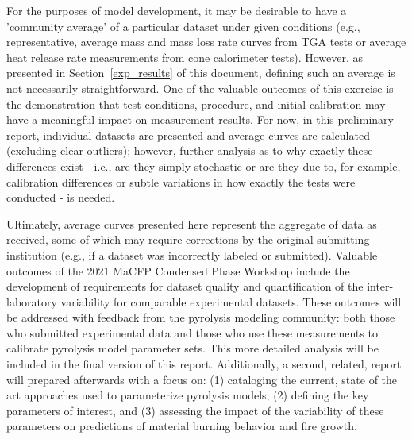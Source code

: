 \documentclass{book}
\begin{document}
For the purposes of model development, it may be desirable to have a 'community average' of a particular dataset under given conditions (e.g., representative, average mass and mass loss rate curves from TGA tests or average heat release rate measurements from cone calorimeter tests). However, as presented in Section~\ref{exp_results} of this document, defining such an average is not necessarily straightforward. One of the valuable outcomes of this exercise is the demonstration that test conditions, procedure, and initial calibration may have a meaningful impact on measurement results. For now, in this preliminary report, individual datasets are presented and average curves are calculated (excluding clear outliers); however, further analysis as to why exactly these differences exist - i.e., are they simply stochastic or are they due to, for example, calibration differences or subtle variations in how exactly the tests were conducted - is needed. 

Ultimately, average curves presented here represent the aggregate of data as received, some of which may require corrections by the original submitting institution (e.g., if a dataset was incorrectly labeled or submitted). Valuable outcomes of the 2021 MaCFP Condensed Phase Workshop include the development of requirements for dataset quality and quantification of the inter-laboratory variability for comparable experimental datasets. These outcomes will be addressed with feedback from the pyrolysis modeling community: both those who submitted experimental data and those who use these measurements to calibrate pyrolysis model parameter sets. This more detailed analysis will be included in the final version of this report. Additionally, a second, related, report will prepared afterwards with a focus on: (1) cataloging the current, state of the art approaches used to parameterize pyrolysis models, (2) defining the key parameters of interest, and (3) assessing the impact of the variability of these parameters on predictions of material burning behavior and fire growth.

{}


\appendix

\end{document}
